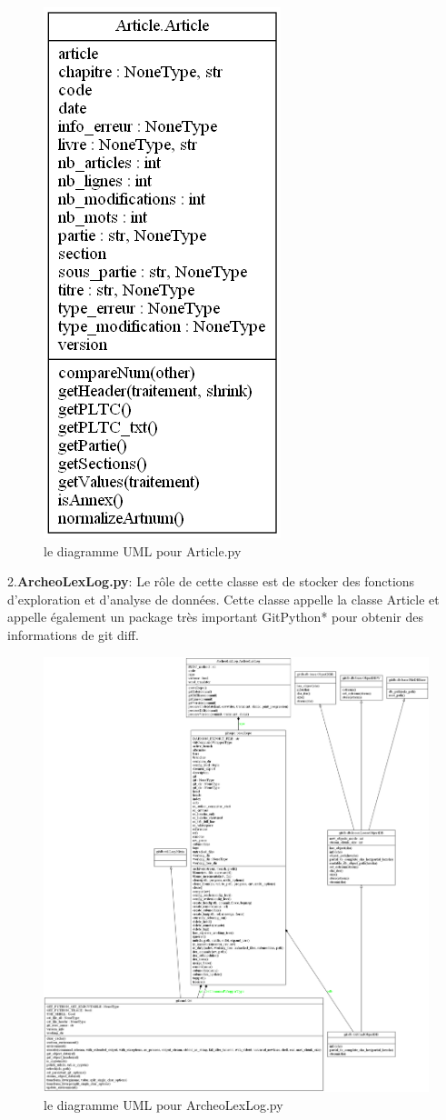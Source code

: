 \documentclass[
  oneside]{book}
\begin{document}
\begin{figure}

{\centering \includegraphics[width=0.25\linewidth]{images/Article_UML} 

}

\caption{le diagramme UML pour Article.py}\label{fig:Article}
\end{figure}

2.\textbf{ArcheoLexLog.py}:
Le rôle de cette classe est de stocker des fonctions d'exploration et d'analyse de données. Cette classe appelle la classe Article et appelle également un package très important GitPython* pour obtenir des informations de git diff.

\begin{figure}

{\centering \includegraphics[width=1\linewidth]{images/ArcheoLexLog_UML} 

}

\caption{le diagramme UML pour ArcheoLexLog.py}\label{fig:ArcheoLexLog}
\end{figure}
\end{document}
